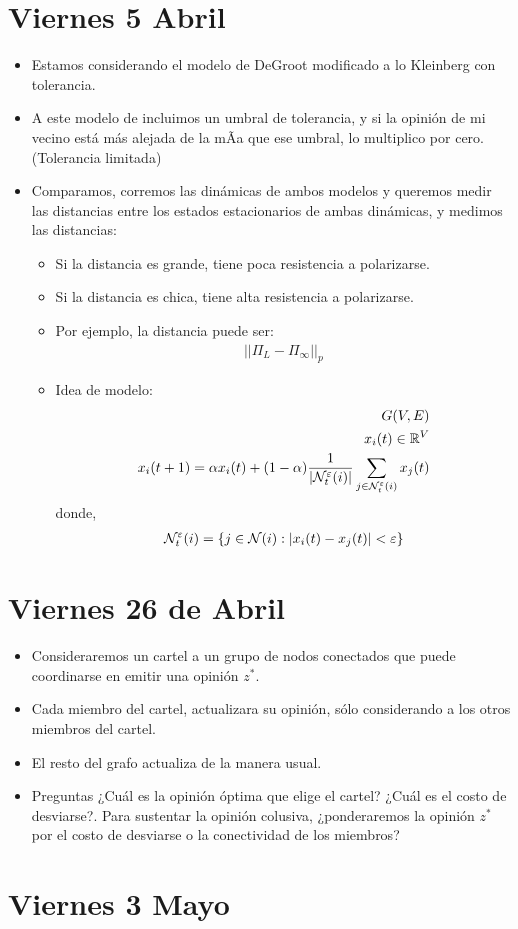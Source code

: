 \documentclass[11pt]{article}
\newcommand{\R}{\mathbb{R}}
\begin{document}
\section*{Viernes 5 Abril}

\begin{itemize}
	\item Estamos considerando el modelo de DeGroot modificado a lo Kleinberg con tolerancia.
	\item A este modelo de incluimos un umbral de tolerancia, y si la opinión de mi vecino está más alejada de la mÃ­a que ese umbral, lo multiplico por cero. (Tolerancia limitada)
	\item Comparamos, corremos las dinámicas de ambos modelos y queremos medir las distancias entre los estados estacionarios de ambas dinámicas, y medimos las distancias:
	\begin{itemize}
	\item Si la distancia es grande, tiene poca resistencia a polarizarse.
	\item Si la distancia es chica, tiene alta resistencia a polarizarse.
	\item Por ejemplo, la distancia puede ser:
	\begin{align*}
		\vert \vert \Pi_L - \Pi_{\infty}\vert \vert _p
	\end{align*}
	\item Idea de modelo:
	\begin{align*}
		G(V,E)\\
		x_i(t)\in \R^V \\
		x_i(t+1) = \alpha x_i(t) + (1-\alpha) \frac{1}{\vert {\cal N}_t^{\varepsilon}(i) \vert} \sum_{j\in {\cal N}_t^{\varepsilon}(i)} x_j(t) 
	\end{align*}
	donde,
	\begin{align*}
		{\cal N}_t^{\varepsilon}(i)=\{j\in {\cal N}(i): \vert x_i(t)-x_j(t)\vert <\varepsilon   \}
	\end{align*}
\end{itemize}

\end{itemize}
\section*{Viernes 26 de Abril}

\begin{itemize}
	\item Consideraremos un cartel a un grupo de nodos conectados que puede coordinarse en emitir una opinión $z^*$.
	\item Cada miembro del cartel, actualizara su opinión, sólo considerando a los  otros miembros del cartel. 
	\item El resto del grafo actualiza de la manera usual.
	\item Preguntas ¿Cuál es la opinión óptima que elige el cartel? ¿Cuál es el costo de desviarse?. Para sustentar la opinión colusiva, ¿ponderaremos la opinión $z^*$ por el costo de desviarse o la conectividad de los miembros?
\end{itemize}
\section*{Viernes 3 Mayo}
\end{document}
